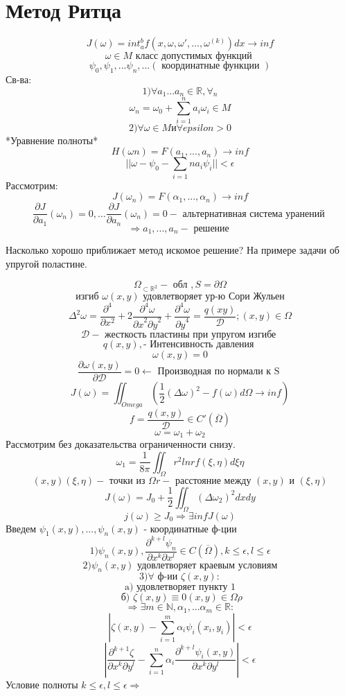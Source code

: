 \documentclass{article}
\begin{document}
\section{Метод Ритца}

\[ J(\omega) = int_{a}^{b} f(x,\omega, \omega', ... , \omega^{(k)}) dx \rightarrow inf \]
\[ \omega \in M \textrm{ класс допустимых функций } \]
\[ \psi_0, \psi_1, ... \psi_n, ... (\textrm{ координатные функции }) \]
Св-ва:
\[ 1) \forall a_1 ... a_n \in \mathbb{R}, \forall_n \]
\[ \omega_n = \omega_0+ \sum_{i=1}^{n} a_i \omega_i \in M \]
\[ 2) \forall \omega \in M\textrm{и} \forall epsilon > 0 \]
*Уравнение полноты*
\[ H(\omega n) = F(a_1, ... , a_n) \rightarrow inf \]
\[ || \omega - \psi_0 - \sum_{i=1}{n} a_i \psi_i || < \epsilon \]
Рассмотрим:
\[ J(\omega_n) = F(\alpha_1, ..., \alpha_n) \rightarrow inf \]
\[ \frac{\partial J}{\partial a_1}(\omega_n)=0, ... \frac{\partial J}{\partial a_n}(\omega_n) = 0 -\textrm{ альтернативная система уранений } \]
\[ \Rightarrow a_1, ... , a_n - \textrm{ решение } \]

Насколько хорошо приближает метод искомое решение?
На примере задачи об упругой поластине.

\[ \Omega_{\subset \mathbb{R}^2} - \textrm{ обл }, S = \partial \Omega \]
\[ \textrm{ изгиб } \omega(x,y) \textrm{ удовлетворяет ур-ю Сори Жульен }\]
\[ \Delta^2 \omega = \frac{\partial^4}{\partial x^2} + 2 \frac{\partial^4 \omega}{{\partial x}^2 {\partial y}^2} + \frac{\partial^4 \omega}{{\partial y}^4} = \frac{q(x y)}{\mathcal{D}}; (x,y) \in \Omega \]
\[ \mathcal{D} - \textrm{ жесткость пластины при упругом изгибе } \]
\[ q(x,y),\textrm{- Интенсивность давления } \]
\[ \omega (x,y) = 0 \]
\[ \frac{\partial \omega (x,y)}{\partial\mathcal{D} } = 0 \leftarrow \textrm{ Производная по нормали к S } \]
\[ J(\omega) = \iint_{Omega}( \frac{1}{2} (\Delta \omega)^2 - f(\omega) d \Omega \rightarrow inf) \]
\[ f = \frac{q(x,y)}{\mathcal{D}} \in C'(\overline{\Omega}) \]
\[ \omega = \omega_1 + \omega_2 \]
Рассмотрим без доказательства ограниченности снизу.
\[ \omega_1 = \frac{1}{8\pi} \iint_{\Omega} r^2 ln r f(\xi, \eta) d\xi \eta \]
\[ (x,y) (\xi, \eta) - \textrm{ точки из } \Omega r-\textrm{ расстояние между } (x,y)\textrm{ и } (\xi, \eta) \]
\[ J(\omega) = J_0 + \frac{1}{2} \iint_{\Omega} (\Delta \omega_2)^2 dx dy \]
\[ j(\omega) \geq J_0 \Rightarrow \exists inf J(\omega)\]
Введем $ \psi_1(x,y), ... , \psi_n(x,y) $ - координатные ф-ции
\[ 1) \psi_n(x,y), \frac{\partial^{k+l} \psi_n}{\partial x^k \partial x^l} \in C( \overline{ \Omega}), k \leq \epsilon , l \leq \epsilon \]
\[ 2) \psi_n(x,y) \textrm{ удовлетворяет краевым условиям} \]
\[ 3) \forall \textrm{ ф-ии } \zeta(x,y): \]
\[ \textrm{ a) удовлетворяет пункту 1 } \]
\[ \textrm{ б) } \zeta(x,y) \equiv 0 (x,y) \in \Omega \rho \]
\[ \Rightarrow \exists m \in \mathbb{N} , \alpha_1, ... \alpha_m \in \mathbb{R}: \]
\[ |\zeta(x,y) - \sum_{i=1}^{m} \alpha_i \psi_i (x_i, y_i)|< \epsilon \]
\[ | \frac{\partial^{k+1}\zeta}{\partial x^k \partial y^l} - \sum_{i=1}^{n} \alpha_i \frac{\partial^{k+l} \psi_i (x,y)}{\partial x^k \partial y^l}| < \epsilon \]
Условие полноты $ k \leq \epsilon, l \leq \epsilon \Rightarrow $
\end{document}
